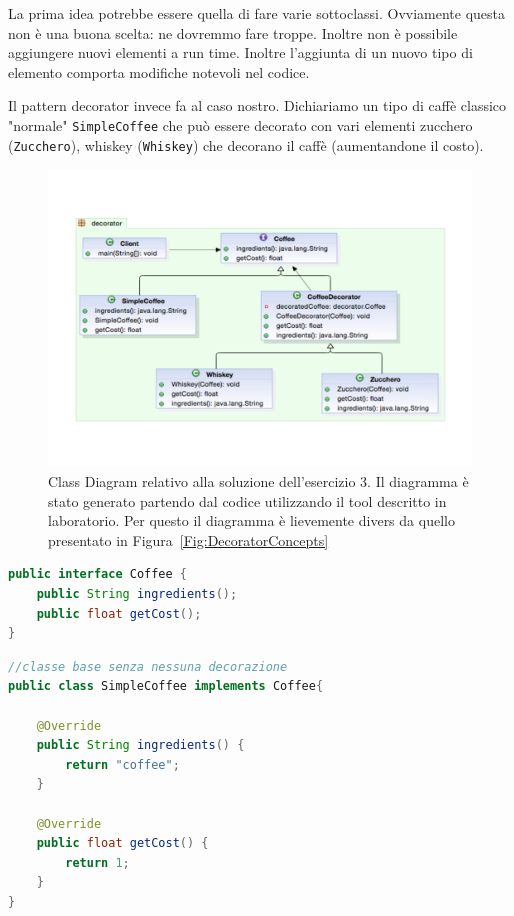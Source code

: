 \documentclass{article}
\begin{document}
La prima idea potrebbe essere quella di fare varie sottoclassi. Ovviamente questa non \`e una buona scelta: ne dovremmo fare troppe. Inoltre non \`e possibile aggiungere nuovi elementi a run time. Inoltre l'aggiunta di un nuovo tipo di elemento comporta modifiche notevoli nel codice.

Il pattern decorator invece fa al caso nostro. Dichiariamo un tipo di caff\`e classico "normale" \texttt{SimpleCoffee} che pu\`o essere decorato con vari elementi zucchero (\texttt{Zucchero}), whiskey (\texttt{Whiskey}) che decorano il caff\`e (aumentandone il costo). 


\begin{figure}[h]
\includegraphics[width=1\textwidth]{Img/DecoratorEsercizio3.pdf}
\caption{Class Diagram relativo alla soluzione dell'esercizio 3. Il diagramma \`e stato generato partendo dal codice utilizzando il tool descritto in laboratorio. Per questo il diagramma \`e lievemente divers da quello presentato in Figura~\ref{Fig:DecoratorConcepts}}
\label{Fig:DecoratorEsercizio3}
\end{figure}

\begin{lstlisting}[language=Java]
public interface Coffee {
	public String ingredients();
	public float getCost();
}
\end{lstlisting}
\begin{lstlisting}[language=Java]
//classe base senza nessuna decorazione
public class SimpleCoffee implements Coffee{

	@Override
	public String ingredients() {
		return "coffee";
	}

	@Override
	public float getCost() {		
		return 1;
	}
}
\end{lstlisting}
\end{document}
